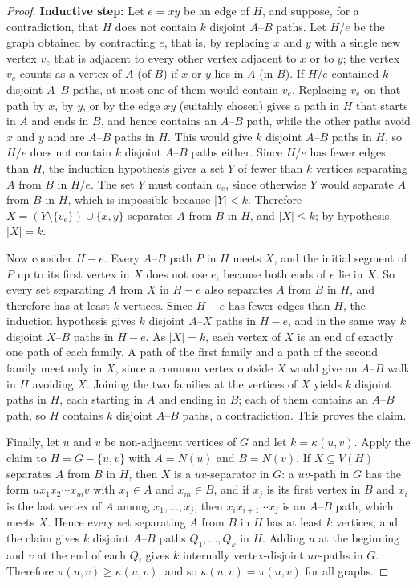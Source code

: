 \documentclass{article}
\theoremstyle{definition}
\begin{document}
\begin{proof}
\textbf{Inductive step:} Let $e = xy$ be an edge of $H$, and suppose, for a contradiction, that $H$ does not contain $k$ disjoint $A$--$B$ paths. Let $H/e$ be the graph obtained by contracting $e$, that is, by replacing $x$ and $y$ with a single new vertex $v_e$ that is adjacent to every other vertex adjacent to $x$ or to $y$; the vertex $v_e$ counts as a vertex of $A$ (of $B$) if $x$ or $y$ lies in $A$ (in $B$). If $H/e$ contained $k$ disjoint $A$--$B$ paths, at most one of them would contain $v_e$. Replacing $v_e$ on that path by $x$, by $y$, or by the edge $xy$ (suitably chosen) gives a path in $H$ that starts in $A$ and ends in $B$, and hence contains an $A$--$B$ path, while the other paths avoid $x$ and $y$ and are $A$--$B$ paths in $H$. This would give $k$ disjoint $A$--$B$ paths in $H$, so $H/e$ does not contain $k$ disjoint $A$--$B$ paths either. Since $H/e$ has fewer edges than $H$, the induction hypothesis gives a set $Y$ of fewer than $k$ vertices separating $A$ from $B$ in $H/e$. The set $Y$ must contain $v_e$, since otherwise $Y$ would separate $A$ from $B$ in $H$, which is impossible because $|Y| < k$. Therefore $X = (Y \setminus \{v_e\}) \cup \{x, y\}$ separates $A$ from $B$ in $H$, and $|X| \leq k$; by hypothesis, $|X| = k$.

Now consider $H - e$. Every $A$--$B$ path $P$ in $H$ meets $X$, and the initial segment of $P$ up to its first vertex in $X$ does not use $e$, because both ends of $e$ lie in $X$. So every set separating $A$ from $X$ in $H - e$ also separates $A$ from $B$ in $H$, and therefore has at least $k$ vertices. Since $H - e$ has fewer edges than $H$, the induction hypothesis gives $k$ disjoint $A$--$X$ paths in $H - e$, and in the same way $k$ disjoint $X$--$B$ paths in $H - e$. As $|X| = k$, each vertex of $X$ is an end of exactly one path of each family. A path of the first family and a path of the second family meet only in $X$, since a common vertex outside $X$ would give an $A$--$B$ walk in $H$ avoiding $X$. Joining the two families at the vertices of $X$ yields $k$ disjoint paths in $H$, each starting in $A$ and ending in $B$; each of them contains an $A$--$B$ path, so $H$ contains $k$ disjoint $A$--$B$ paths, a contradiction. This proves the claim.

Finally, let $u$ and $v$ be non-adjacent vertices of $G$ and let $k = \kappa(u,v)$. Apply the claim to $H = G - \{u,v\}$ with $A = N(u)$ and $B = N(v)$. If $X \subseteq V(H)$ separates $A$ from $B$ in $H$, then $X$ is a $uv$-separator in $G$: a $uv$-path in $G$ has the form $u x_1 x_2 \cdots x_m v$ with $x_1 \in A$ and $x_m \in B$, and if $x_j$ is its first vertex in $B$ and $x_i$ is the last vertex of $A$ among $x_1, \ldots, x_j$, then $x_i x_{i+1} \cdots x_j$ is an $A$--$B$ path, which meets $X$. Hence every set separating $A$ from $B$ in $H$ has at least $k$ vertices, and the claim gives $k$ disjoint $A$--$B$ paths $Q_1, \ldots, Q_k$ in $H$. Adding $u$ at the beginning and $v$ at the end of each $Q_i$ gives $k$ internally vertex-disjoint $uv$-paths in $G$. Therefore $\pi(u,v) \geq \kappa(u,v)$, and so $\kappa(u,v) = \pi(u,v)$ for all graphs.
\end{proof}
\end{document}
